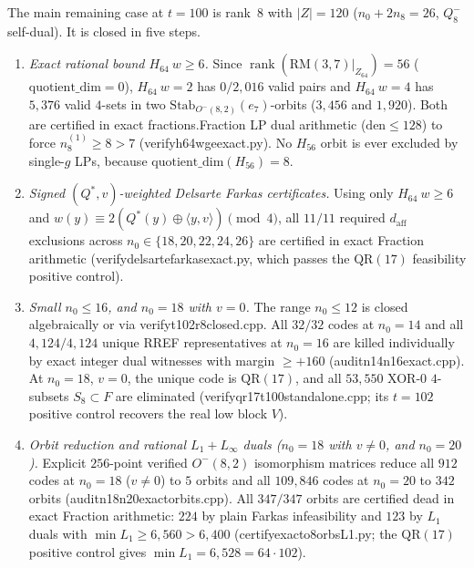 \documentclass[11pt]{article}
\theoremstyle{definition}
\newcommand{\rank}{\operatorname{rank}}
\newcommand{\code}[1]{{\ttfamily\small\renewcommand{\_}{\textunderscore\allowbreak}#1}}
\begin{document}
The main remaining case at $t = 100$ is rank~$8$ with $|Z| = 120$ ($n_0 + 2n_8 = 26$, $Q_8^-$ self-dual). It is closed in five steps.
\begin{enumerate}[nosep]
  \item \emph{Exact rational bound $H_{64}\ w \ge 6$.} Since $\rank(\mathrm{RM}(3,7)|_{Z_{64}}) = 56$ ($\mathrm{quotient\_dim}=0$), $H_{64}\ w=2$ has $0/2{,}016$ valid pairs and $H_{64}\ w=4$ has $5{,}376$ valid $4$-sets in two $\mathrm{Stab}_{O^-(8,2)}(e_7)$-orbits ($3{,}456$ and $1{,}920$). Both are certified in exact \code{fractions.Fraction} LP dual arithmetic ($\text{den} \le 128$) to force $n_8^{(1)} \ge 8 > 7$ (\code{verify\_h64\_w\_ge\_6\_exact.py}). No $H_{56}$ orbit is ever excluded by single-$g$ LPs, because $\mathrm{quotient\_dim}(H_{56}) = 8$.
  \item \emph{Signed $(Q^*, v)$-weighted Delsarte Farkas certificates.} Using only $H_{64}\ w \ge 6$ and $w(y) \equiv 2(Q^*(y) \oplus \langle y, v\rangle) \pmod 4$, all $11/11$ required $d_{\mathrm{aff}}$ exclusions across $n_0 \in \{18, 20, 22, 24, 26\}$ are certified in exact \code{Fraction} arithmetic (\code{verify\_delsarte\_farkas\_exact.py}, which passes the $\mathrm{QR}(17)$ feasibility positive control).
  \item \emph{Small $n_0 \le 16$, and $n_0 = 18$ with $v = 0$.} The range $n_0 \le 12$ is closed algebraically or via \code{verify\_t102\_r8\_closed.cpp}. All $32/32$ codes at $n_0 = 14$ and all $4{,}124/4{,}124$ unique RREF representatives at $n_0 = 16$ are killed individually by exact integer dual witnesses with margin $\ge +160$ (\code{audit\_n14\_n16\_exact.cpp}). At $n_0 = 18$, $v=0$, the unique code is $\mathrm{QR}(17)$, and all $53{,}550$ XOR-$0$ $4$-subsets $S_8 \subset F$ are eliminated (\code{verify\_qr17\_t100\_standalone.cpp}; its $t=102$ positive control recovers the real low block $V$).
  \item \emph{Orbit reduction and rational $L_1 + L_\infty$ duals ($n_0 = 18$ with $v\neq 0$, and $n_0 = 20$).} Explicit $256$-point verified $O^-(8,2)$ isomorphism matrices reduce all $912$ codes at $n_0 = 18$ ($v \neq 0$) to $5$ orbits and all $109{,}846$ codes at $n_0 = 20$ to $342$ orbits (\code{audit\_n18\_n20\_exact\_orbits.cpp}). All $347/347$ orbits are certified dead in exact \code{Fraction} arithmetic: $224$ by plain Farkas infeasibility and $123$ by $L_1$ duals with $\min L_1 \ge 6{,}560 > 6{,}400$ (\code{certify\_exact\_o8\_orbs\_L1.py}; the $\mathrm{QR}(17)$ positive control gives $\min L_1 = 6{,}528 = 64 \cdot 102$).

\end{enumerate}
\end{document}

